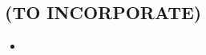 \begin{unsortedStuff}	
\section*{(TO INCORPORATE)}
	\begin{itemize}
		\item 
	\end{itemize}
\end{unsortedStuff}
		
\begin{optBlankSpace}
	\newpage
	\mbox{}
\end{optBlankSpace}

